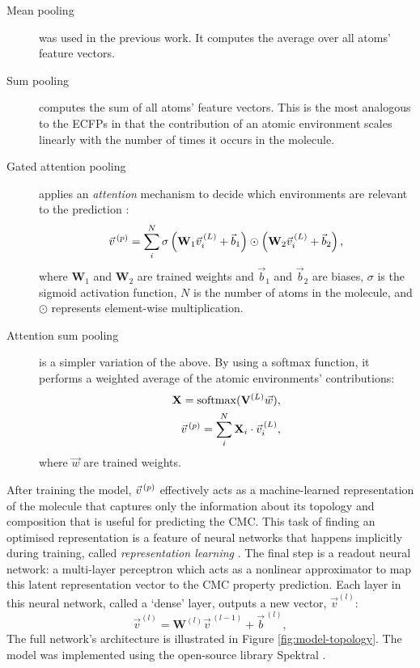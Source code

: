 \begin{description}
    \item[Mean pooling] was used in the previous work. It computes the average
          over all atoms' feature vectors.
    \item[Sum pooling] computes the sum of all atoms' feature vectors. This is
          the most analogous to the ECFPs in that the contribution of an atomic environment
          scales linearly with the number of times it occurs in the molecule.
    \item[Gated attention pooling] applies an \emph{attention} mechanism to decide which environments
          are relevant to the prediction \cite{liGatedGraphSequence2017}:
          \begin{equation}
              \vec{v}^{\,(p)}{} = \sum_i^N \sigma\left(\mathbf{W}_1 \vec{v}_i^{\,(L)} + \vec{b}_1 \right) \odot \left(\mathbf{W}_2 \vec{v}_i^{\,(L)} + \vec{b}_2 \right),
          \end{equation}
          where $\mathbf{W}_1$ and $\mathbf{W}_2$ are trained weights and
          $\vec{b}_1$ and $\vec{b}_2$ are biases, $\sigma$ is the sigmoid
          activation function, $N$ is the number of atoms in the molecule, and
          $\odot$ represents element-wise multiplication.
    \item[Attention sum pooling] is a simpler variation of the above. By using a
          softmax function, it performs a weighted average of the atomic environments'
          contributions:
          \begin{align}
              \mathbf{X} = \mathrm{softmax}(\mathbf{V}^{(L)}\vec{w}), \\
              \vec{v}^{\,(p)}{} = \sum_i^N \mathbf{X}_i \cdot \vec{v}^{\,(L)}_i,
          \end{align}
          where $\vec{w}$ are trained weights.
\end{description}

After training the model, $\vec{v}^{\,(p)}{}$ effectively acts as a machine-learned
representation of the molecule that captures only the information about its
topology and composition that is useful for predicting the CMC. This task of
finding an optimised representation is a feature of neural networks that happens
implicitly during training, called \emph{representation learning}
\cite{goodfellowDeepLearning2016a}. The final step is a readout neural network:
a multi-layer perceptron which acts as a nonlinear approximator to map this
latent representation vector to the CMC property prediction. Each layer in this
neural network, called a `dense' layer, outputs a new vector, $\vec{v}^{(l)}$:
\begin{equation}
    \vec{v}^{(l)} = \mathbf{W}^{(l)}\vec{v}^{\,(l-1)} + \vec{b}^{\,(l)},
\end{equation}
The full network's architecture is illustrated in Figure
\ref{fig:model-topology}. The model was implemented using the open-source
library Spektral \cite{grattarolaGraphNeuralNetworks2020}.

